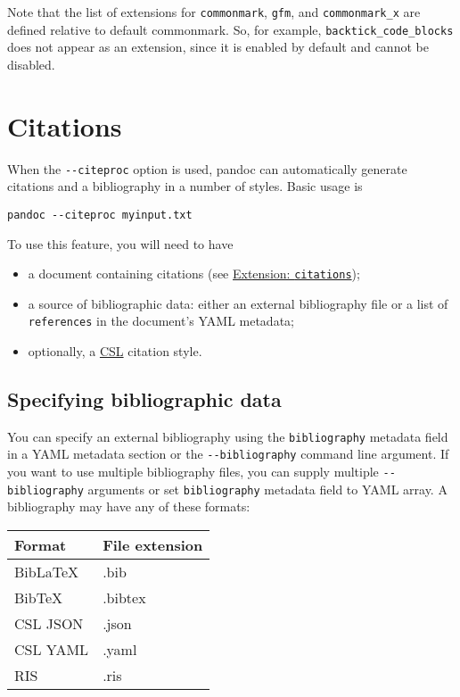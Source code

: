 Note that the list of extensions for \texttt{commonmark}, \texttt{gfm},
and \texttt{commonmark\_x} are defined relative to default commonmark.
So, for example, \texttt{backtick\_code\_blocks} does not appear as an
extension, since it is enabled by default and cannot be disabled.

\hypertarget{citations}{%
\section{Citations}\label{citations}}

When the \texttt{-\/-citeproc} option is used, pandoc can automatically
generate citations and a bibliography in a number of styles. Basic usage
is

\begin{verbatim}
pandoc --citeproc myinput.txt
\end{verbatim}

To use this feature, you will need to have

\begin{itemize}
\tightlist
\item
  a document containing citations (see
  \protect\hyperlink{extension-citations}{Extension:
  \texttt{citations}});
\item
  a source of bibliographic data: either an external bibliography file
  or a list of \texttt{references} in the document's YAML metadata;
\item
  optionally, a
  \href{https://docs.citationstyles.org/en/stable/specification.html}{CSL}
  citation style.
\end{itemize}

\hypertarget{specifying-bibliographic-data}{%
\subsection{Specifying bibliographic
data}\label{specifying-bibliographic-data}}

You can specify an external bibliography using the \texttt{bibliography}
metadata field in a YAML metadata section or the
\texttt{-\/-bibliography} command line argument. If you want to use
multiple bibliography files, you can supply multiple
\texttt{-\/-bibliography} arguments or set \texttt{bibliography}
metadata field to YAML array. A bibliography may have any of these
formats:

\begin{longtable}[]{@{}ll@{}}
\toprule()
Format & File extension \\
\midrule()
\endhead
BibLaTeX & .bib \\
BibTeX & .bibtex \\
CSL JSON & .json \\
CSL YAML & .yaml \\
RIS & .ris \\
\bottomrule()
\end{longtable}

